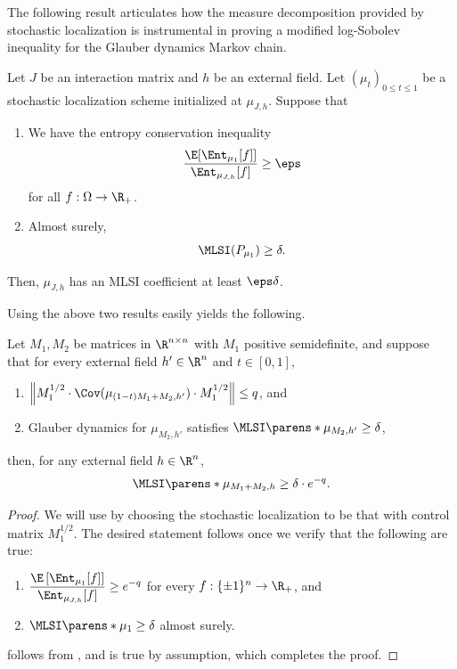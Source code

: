 \documentclass[11pt,letterpaper]{article}
\begin{document}
    The following result articulates how the measure decomposition provided by stochastic localization is instrumental in proving a modified log-Sobolev inequality for the Glauber dynamics Markov chain.
    \begin{theorem}[{\cite[Theorem 47]{CE22}}]  \label{thm:anneal}
        Let $J$ be an interaction matrix and $h$ be an external field.
        Let $(\mu_t)_{0\le t\le 1}$ be a stochastic localization scheme initialized at $\mu_{J,h}$.
        Suppose that
        \begin{enumerate}
            \item \label{item:entropy-conservation} We have the entropy conservation inequality
            \[ \frac{\E[\Ent_{\mu_1}[f]]}{\Ent_{\mu_{J,h}}[f]} \ge \eps \]
            for all $f : \Omega \to \R_+$.
            \item \label{item:MLSI-target} Almost surely,
            \[ \MLSI(P_{\mu_1}) \ge \delta. \]
        \end{enumerate}
        Then, $\mu_{J,h}$ has an MLSI coefficient at least $\eps\delta$.
    \end{theorem}

    Using the above two results easily yields the following.

    \begin{theorem} \label{thm:sum-MLSI}
        Let $M_1,M_2$ be matrices in $\R^{n \times n}$ with $M_1$ positive semidefinite, and suppose that for every external field $h' \in \R^{n}$ and $t\in[0,1]$,
        \begin{enumerate}
            \item $\left\| M_1^{1/2} \cdot \Cov(\mu_{(1-t)M_1+M_2,h'}) \cdot M_1^{1/2} \right\| \le q$, and
            \item Glauber dynamics for $\mu_{M_2,h'}$ satisfies $\MLSI\parens*{\mu_{M_2,h'}} \ge \delta$,
        \end{enumerate}
        then, for any external field $h \in \R^{n}$,
        \[
            \MLSI\parens*{\mu_{M_1+M_2,h}} \ge \delta \cdot e^{-q}.    
        \]
    \end{theorem}
    
    \begin{proof}
        We will use  by choosing the stochastic localization to be that with control matrix $M_1^{1/2}$.
        \noindent The desired statement follows once we verify that the following are true:
        \begin{enumerate}
            \item \label{item:entropy-con} $\displaystyle\frac{\E \left[\Ent_{\mu_1}[f]\right]}{\Ent_{\mu_{J,h}}[f]} \ge e^{-q}$ for every $f:\{\pm1\}^n\to\R_+$, and
            \item \label{item:final-MLSI} $\MLSI\parens*{\mu_1} \ge \delta$ almost surely.
        \end{enumerate}
         follows from , and  is true by assumption, which completes the proof.
    \end{proof}
    
\end{document}
